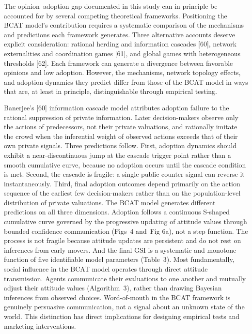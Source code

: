 \documentclass[10pt,letterpaper]{article}
\begin{document}
The opinion--adoption gap documented in this study can in principle be accounted for by several competing theoretical frameworks. Positioning the BCAT model's contribution requires a systematic comparison of the mechanisms and predictions each framework generates. Three alternative accounts deserve explicit consideration: rational herding and information cascades [60], network externalities and coordination games [61], and global games with heterogeneous thresholds [62]. Each framework can generate a divergence between favorable opinions and low adoption. However, the mechanisms, network topology effects, and adoption dynamics they predict differ from those of the BCAT model in ways that are, at least in principle, distinguishable through empirical testing.

Banerjee's [60] information cascade model attributes adoption failure to the rational suppression of private information. Later decision-makers observe only the actions of predecessors, not their private valuations, and rationally imitate the crowd when the inferential weight of observed actions exceeds that of their own private signals. Three predictions follow. First, adoption dynamics should exhibit a near-discontinuous jump at the cascade trigger point rather than a smooth cumulative curve, because no adoption occurs until the cascade condition is met. Second, the cascade is fragile: a single public counter-signal can reverse it instantaneously. Third, final adoption outcomes depend primarily on the action sequence of the earliest few decision-makers rather than on the population-level distribution of private valuations. The BCAT model generates different predictions on all three dimensions. Adoption follows a continuous S-shaped cumulative curve governed by the progressive updating of attitude values through bounded confidence communication (Figs~4 and~Fig 6a), not a step function. The process is not fragile because attitude updates are persistent and do not rest on inferences from early movers. And the final GSI is a systematic and monotone function of five identifiable model parameters (Table~3). Most fundamentally, social influence in the BCAT model operates through direct attitude transmission. Agents communicate their evaluations to one another and mutually adjust their attitude values (Algorithm~3), rather than drawing Bayesian inferences from observed choices. Word-of-mouth in the BCAT framework is genuinely persuasive communication, not a signal about an unknown state of the world. This distinction has direct implications for designing empirical tests and marketing interventions.
\end{document}

